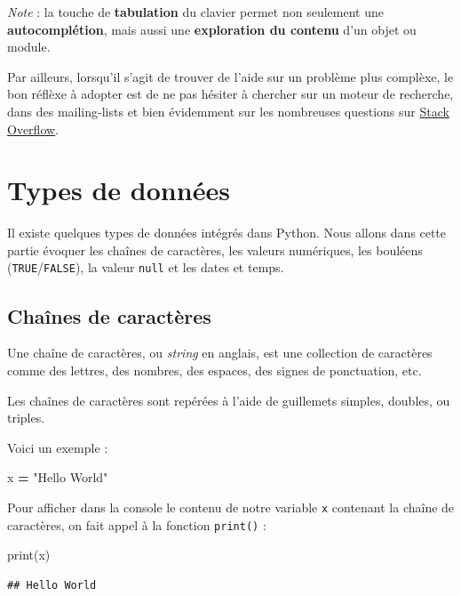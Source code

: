 \documentclass[
  12pt,
]{book}
\newenvironment{Shaded}{\begin{snugshade}}{\end{snugshade}}
\newcommand{\BuiltInTok}[1]{#1}
\newcommand{\NormalTok}[1]{#1}
\newcommand{\OperatorTok}[1]{\textcolor[rgb]{0.81,0.36,0.00}{\textbf{#1}}}
\newcommand{\StringTok}[1]{\textcolor[rgb]{0.31,0.60,0.02}{#1}}
\numberwithin{equation}{section}
\numberwithin{countremarque}{section}
\begin{document}
\emph{Note} : la touche de \textbf{tabulation} du clavier permet non seulement une \textbf{autocomplétion}, mais aussi une \textbf{exploration du contenu} d'un objet ou module.

Par ailleurs, lorsqu'il s'agit de trouver de l'aide sur un problème plus complèxe, le bon réflèxe à adopter est de ne pas hésiter à chercher sur un moteur de recherche, dans des mailing-lists et bien évidemment sur les nombreuses questions sur \href{https://stackoverflow.com}{Stack Overflow}.

\chapter{Types de données}\label{types-de-donnuxe9es}

Il existe quelques types de données intégrés dans Python. Nous allons dans cette partie évoquer les chaînes de caractères, les valeurs numériques, les bouléens (\texttt{TRUE}/\texttt{FALSE}), la valeur \texttt{null} et les dates et temps.

\section{Chaînes de caractères}\label{chauxeenes-de-caractuxe8res}

Une chaîne de caractères, ou \emph{string} en anglais, est une collection de caractères comme des lettres, des nombres, des espaces, des signes de ponctuation, etc.

Les chaînes de caractères sont repérées à l'aide de guillemets simples, doubles, ou triples.

Voici un exemple :

\begin{Shaded}
\begin{Highlighting}[]
\NormalTok{x }\OperatorTok{=} \StringTok{"Hello World"}
\end{Highlighting}
\end{Shaded}

Pour afficher dans la console le contenu de notre variable \texttt{x} contenant la chaîne de caractères, on fait appel à la fonction \texttt{print()} :

\begin{Shaded}
\begin{Highlighting}[]
\BuiltInTok{print}\NormalTok{(x)}
\end{Highlighting}
\end{Shaded}

\begin{lstlisting}
## Hello World
\end{lstlisting}
\end{document}
